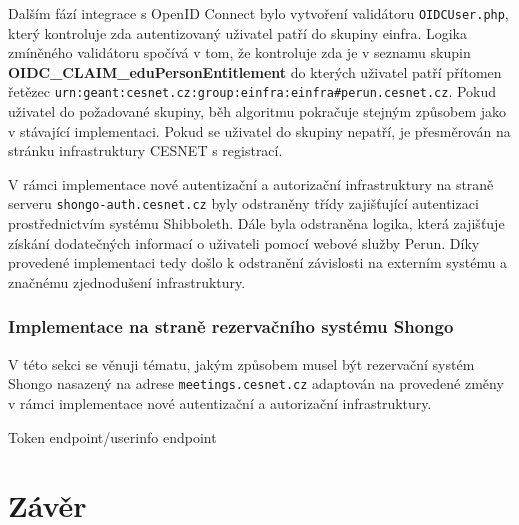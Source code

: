 \documentclass[
  printed, %
  twoside, %
  table,   %
  nolof,     %
  nolot,     %
]{fithesis3}
\begin{document}
Dalším fází integrace s OpenID Connect bylo vytvoření validátoru \texttt{OIDCUser.php}, který kontroluje zda autentizovaný uživatel patří do skupiny einfra.  Logika zmíněného validátoru spočívá v tom, že kontroluje zda je v seznamu skupin \textbf{OIDC\_CLAIM\_eduPersonEntitlement} do kterých uživatel patří přítomen řetězec \texttt{urn:geant:cesnet.cz:group:einfra:einfra\#perun.cesnet.cz}. Pokud uživatel do požadované skupiny, běh algoritmu pokračuje stejným způsobem jako v stávající implementaci. Pokud se uživatel do skupiny nepatří, je přesměrován na stránku infrastruktury CESNET s registrací.   

\par

V rámci implementace nové autentizační a autorizační infrastruktury na straně serveru \texttt{shongo-auth.cesnet.cz} byly odstraněny třídy zajišťující autentizaci prostřednictvím systému Shibboleth. Dále byla odstraněna logika, která zajišťuje získání dodatečných informací o uživateli pomocí webové služby Perun. Díky provedené implementaci tedy došlo k odstranění závislosti na externím systému a značnému zjednodušení infrastruktury.

\subsection{Implementace na straně rezervačního systému Shongo}
\label{ShongoImpl-web}
V této sekci se věnuji tématu, jakým způsobem musel být rezervační systém Shongo nasazený na adrese \texttt{meetings.cesnet.cz} adaptován na provedené změny v rámci implementace nové autentizační a autorizační infrastruktury. 

Token endpoint/userinfo endpoint

\chapter{Závěr}
\printbibliography[title={Literatura}]
\end{document}
